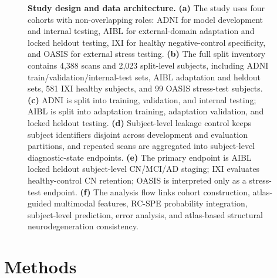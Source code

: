 \begin{figure}[p]
    \centering
    \caption{\textbf{Study design and data architecture.} \textbf{(a)} The study uses four cohorts with non-overlapping roles: ADNI for model development and internal testing, AIBL for external-domain adaptation and locked heldout testing, IXI for healthy negative-control specificity, and OASIS for external stress testing. \textbf{(b)} The full split inventory contains 4{,}388 scans and 2{,}023 split-level subjects, including ADNI train/validation/internal-test sets, AIBL adaptation and heldout sets, 581 IXI healthy subjects, and 99 OASIS stress-test subjects. \textbf{(c)} ADNI is split into training, validation, and internal testing; AIBL is split into adaptation training, adaptation validation, and locked heldout testing. \textbf{(d)} Subject-level leakage control keeps subject identifiers disjoint across development and evaluation partitions, and repeated scans are aggregated into subject-level diagnostic-state endpoints. \textbf{(e)} The primary endpoint is AIBL locked heldout subject-level CN/MCI/AD staging; IXI evaluates healthy-control CN retention; OASIS is interpreted only as a stress-test endpoint. \textbf{(f)} The analysis flow links cohort construction, atlas-guided multimodal features, RC-SPE probability integration, subject-level prediction, error analysis, and atlas-based structural neurodegeneration consistency.}
    \label{fig:v6_framework}
\end{figure}


\section{Methods}
\label{sec:methods}

